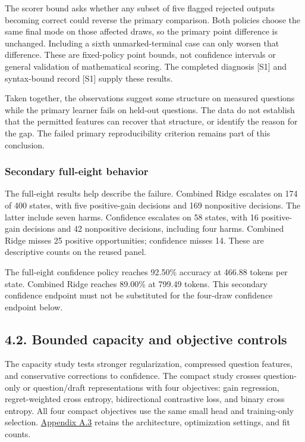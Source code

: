 \documentclass[11pt,a4paper]{article}
\begin{document}
The scorer bound asks whether any subset of five flagged rejected outputs becoming correct could reverse the primary comparison. Both policies choose the same final mode on those affected draws, so the primary point difference is unchanged. Including a sixth unmarked-terminal case can only worsen that difference. These are fixed-policy point bounds, not confidence intervals or general validation of mathematical scoring. The completed diagnosis [S1] and syntax-bound record [S1] supply these results.

Taken together, the observations suggest some structure on measured questions while the primary learner fails on held-out questions. The data do not establish that the permitted features can recover that structure, or identify the reason for the gap. The failed primary reproducibility criterion remains part of this conclusion.

\subsubsection*{Secondary full-eight behavior}\label{sec:secondary-full-eight-behavior}
The full-eight results help describe the failure. Combined Ridge escalates on 174 of 400 states, with five positive-gain decisions and 169 nonpositive decisions. The latter include seven harms. Confidence escalates on 58 states, with 16 positive-gain decisions and 42 nonpositive decisions, including four harms. Combined Ridge misses 25 positive opportunities; confidence misses 14. These are descriptive counts on the reused panel.

The full-eight confidence policy reaches 92.50\% accuracy at 466.88 tokens per state. Combined Ridge reaches 89.00\% at 799.49 tokens. This secondary confidence endpoint must not be substituted for the four-draw confidence endpoint below.

\subsection*{4.2. Bounded capacity and objective controls}\label{sec:42-bounded-capacity-and-objective-controls}
The capacity study tests stronger regularization, compressed question features, and conservative corrections to confidence. The compact study crosses question-only or question/draft representations with four objectives: gain regression, regret-weighted cross entropy, bidirectional contrastive loss, and binary cross entropy. All four compact objectives use the same small head and training-only selection. \hyperref[sec:a3-control-implementation-and-encoder-timing]{Appendix A.3} retains the architecture, optimization settings, and fit counts.
\end{document}
